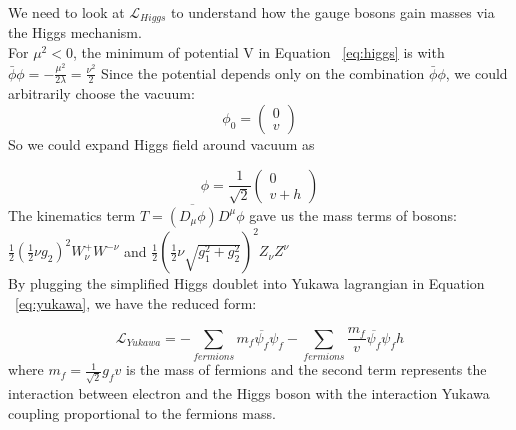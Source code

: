We need to look at $ \mathcal{L}_{Higgs}$ to understand how the gauge bosons gain masses via the Higgs mechanism.\\
For $\mu^2<0$, the minimum of potential V in Equation ~\ref{eq:higgs} is with  $\bar{\phi}\phi=-\frac{\mu^2}{2\lambda}=\frac{\nu^2}{2}$
 Since the potential depends
only on the combination $\bar{\phi}\phi$, we could arbitrarily choose the vacuum:
\begin{equation}
      \phi_0=\left( \begin{smallmatrix} 0\\v \end{smallmatrix}\right)
          \label{eq:vac}
\end{equation}
So we could expand Higgs field around vacuum as 

\begin{equation}
    \phi=\frac{1}{\sqrt{2}}\left( \begin{smallmatrix} 0\\v + h \end{smallmatrix}\right)
          \label{eq:vac}
\end{equation}
The kinematics term $T=\overline{\left(D_\mu\phi\right)}D^\mu\phi $ gave us the mass terms of  bosons:\\ 
 $\frac{1}{2}(\frac{1}{2}\nu g_2)^2 W_\nu^+  W^{-\nu}$ and $\frac{1}{2}(\frac{1}{2}\nu \sqrt{g_1^2+g_2^2})^2 Z_\nu Z^\nu$\\
By plugging the simplified Higgs doublet into Yukawa lagrangian in Equation ~\ref{eq:yukawa}, we have the reduced form:

\begin{equation}
    \mathcal{L}_{Yukawa} = - \sum_{fermions} m_f \overline{\psi_f}\psi_f - \sum_{fermions} \frac{m_f}{v} \overline{\psi_f}\psi_f h
          \label{eq:vac}
\end{equation}
where $m_f=\frac{1}{\sqrt{2}} g_f v $ is the mass of fermions and the second term represents the interaction between electron and the Higgs boson
with the interaction Yukawa coupling proportional to the fermions mass. 

